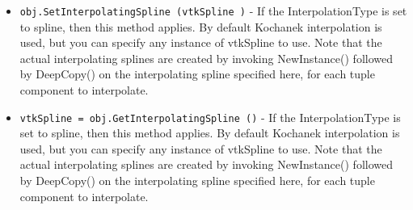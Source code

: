\begin{itemize}
\item  \verb|obj.SetInterpolatingSpline (vtkSpline )| -  If the InterpolationType is set to spline, then this method applies. By
 default Kochanek interpolation is used, but you can specify any instance
 of vtkSpline to use. Note that the actual interpolating splines are
 created by invoking NewInstance() followed by DeepCopy() on the
 interpolating spline specified here, for each tuple component to
 interpolate.

\item  \verb|vtkSpline = obj.GetInterpolatingSpline ()| -  If the InterpolationType is set to spline, then this method applies. By
 default Kochanek interpolation is used, but you can specify any instance
 of vtkSpline to use. Note that the actual interpolating splines are
 created by invoking NewInstance() followed by DeepCopy() on the
 interpolating spline specified here, for each tuple component to
 interpolate.

\end{itemize}

